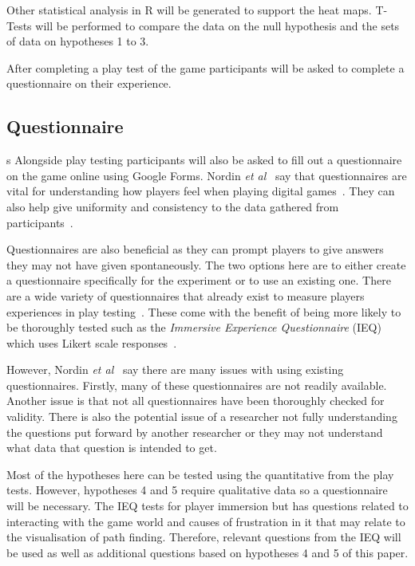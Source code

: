 \documentclass[journal]{IEEEtran}
\begin{document}
Other statistical analysis in R will be generated to support the heat maps. T-Tests will be performed to compare the data on the null hypothesis and the sets of data on hypotheses 1 to 3.
 
After completing a play test of the game participants will be asked to complete a questionnaire on their experience.

\subsection{Questionnaire} \label{Questionnaire}s
Alongside play testing participants will also be asked to fill out a questionnaire on the game online using Google Forms. Nordin \textit{et al}~\cite{nordin2014} say that questionnaires are vital for understanding how players feel when playing digital games~\cite{nordin2014,Denisova2016}. They can also help give uniformity and consistency to the data gathered from participants~\cite{Denisova2016}.

Questionnaires are also beneficial as they can prompt players to give answers they may not have given spontaneously. The two options here are to either create a questionnaire specifically for the experiment or to use an existing one. There are a wide variety of questionnaires that already exist to measure players experiences in play testing~\cite{nordin2014,Jennett2008}. These come with the benefit of being more likely to be thoroughly tested such as the \textit{Immersive Experience
Questionnaire} (IEQ) which uses Likert scale responses~\cite{nordin2014,Jennett2008}.
 
However, Nordin \textit{et al}~\cite{nordin2014} say there are many issues with using existing questionnaires. Firstly, many of these questionnaires are not readily available. Another issue is that not all questionnaires have been thoroughly checked for validity. There is also the potential issue of a researcher not fully understanding the questions put forward by another researcher or they may not understand what data that question is intended to get.

Most of the hypotheses here can be tested using the quantitative from the play tests. However, hypotheses 4 and 5 require qualitative data so a questionnaire will be necessary. The IEQ tests for player immersion but has questions related to interacting with the game world and causes of frustration in it that may relate to the visualisation of path finding.  Therefore, relevant questions from the IEQ will be used as well as additional questions based on hypotheses 4 and 5 of this paper.
\end{document}
